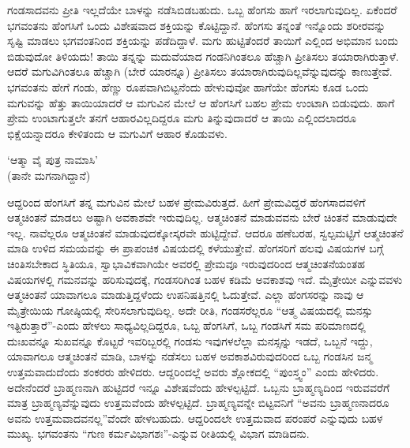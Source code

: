 ಗಂಡಸಾದವನು ಪ್ರೀತಿ ಇಲ್ಲದೆಯೇ ಬಾಳನ್ನು ನಡೆಸಿಬಿಡಬಹುದು. ಒಬ್ಬ ಹೆಂಗಸು ಹಾಗೆ ಇರಲಾಗುವುದಿಲ್ಲ. ಏಕೆಂದರೆ ಭಗವಂತನು ಹೆಂಗಸಿಗೆ ಒಂದು ವಿಶೇಷವಾದ ಶಕ್ತಿಯನ್ನು ಕೊಟ್ಟಿದ್ದಾನೆ. ಹೆಂಗಸು ತನ್ನಂತೆ ಇನ್ನೊಂದು ಶರೀರವನ್ನು ಸೃಷ್ಟಿ ಮಾಡಲು ಭಗವಂತನಿಂದ ಶಕ್ತಿಯನ್ನು ಪಡೆದಿದ್ದಾಳೆ. ಮಗು ಹುಟ್ಟಿತೆಂದರೆ ತಾಯಿಗೆ ಎಲ್ಲಿಂದ ಅಭಿಮಾನ ಬಂದು ಬಿಡುವುದೋ ತಿಳಿಯದು! ತಾಯಿ ತನ್ನನ್ನು ಮದುವೆಯಾದ ಗಂಡನಿಗಿಂತಲೂ ಹೆಚ್ಚಾಗಿ ಪ್ರೀತಿಸಲು ತಯಾರಾಗಿರುತ್ತಾಳೆ. ಆದರೆ ಮಗುವಿಗಿಂತಲೂ ಹೆಚ್ಚಾಗಿ (ಬೇರೆ ಯಾರನ್ನೂ) ಪ್ರೀತಿಸಲು ತಯಾರಾಗಿರುವುದಿಲ್ಲವೆನ್ನುವುದನ್ನು ಕಾಣುತ್ತೇವೆ. ಭಗವಂತನು ಹೇಗೆ ಗಂಡು, ಹೆಣ್ಣು ರೂಪವಾಗಿಬಿಟ್ಟನೆಂದು ಹೇಳುವುವೋ ಹಾಗೆಯೇ ಹೆಂಗಸು ಕೂಡ ಒಂದು ಮಗುವನ್ನು ಹೆತ್ತು ತಾಯಿಯಾದರೆ ಆ ಮಗುವಿನ ಮೇಲೆ ಆ ಹೆಂಗಸಿಗೆ ಬಹಲ ಪ್ರೇಮ ಉಂಟಾಗಿ ಬಿಡುವುದು. ಹಾಗೆ ಪ್ರೇಮ ಉಂಟಾಗುತ್ತಲೇ ತನಗೆ ಆಹಾರವಿಲ್ಲದಿದ್ದರೂ ಮಗು ತಿನ್ನುವುದಾದರೆ ಆ ತಾಯಿ ಎಲ್ಲಿಂದಲಾದರೂ ಭಿಕ್ಷೆಯನ್ನಾದರೂ ಕೇಳಿತಂದು ಆ ಮಗುವಿಗೆ ಆಹಾರ ಕೊಡುವಳು.

\begin{shloka}
`ಆತ್ಮಾ ವೈ ಪುತ್ರ ನಾಮಾಸಿ'\\
(ತಾನೇ ಮಗನಾಗಿದ್ದಾನೆ)
\end{shloka}

ಆದ್ದರಿಂದ ಹೆಂಗಸಿಗೆ ತನ್ನ ಮಗುವಿನ ಮೇಲೆ ಬಹಳ ಪ್ರೇಮವಿರುತ್ತದೆ. ಹೀಗೆ ಪ್ರೇಮವಿದ್ದರೆ ಹೆಂಗಸಾದವಳಿಗೆ ಆತ್ಮಚಿಂತನೆ ಮಾಡಲು ಅಷ್ಟಾಗಿ ಅವಕಾಶವೇ ಇರುವುದಿಲ್ಲ. ಆತ್ಮಚಿಂತನೆ ಮಾಡುವವನು ಬೇರೆ ಚಿಂತನೆ ಮಾಡುವುದೇ ಇಲ್ಲ. ನಾವೆಲ್ಲರೂ ಆತ್ಮಚಿಂತನೆ ಮಾಡುವುದಕ್ಕೋಸ್ಕರವೇ ಹುಟ್ಟಿದ್ದೇವೆ. ಆದರೂ ಹಣೆಬರಹ, ಸ್ವಲ್ಪಮಟ್ಟಿಗೆ ಆತ್ಮಚಿಂತನೆ ಮಾಡಿ ಉಳಿದ ಸಮಯವನ್ನು ಈ ಪ್ರಾಪಂಚಿಕ ವಿಷಯದಲ್ಲಿ ಕಳೆಯುತ್ತೇವೆ. ಹೆಂಗಸರಿಗೆ ಹಲವು ವಿಷಯಗಳ ಬಗ್ಗೆ ಚಿಂತಿಸಬೇಕಾದ ಸ್ಥಿತಿಯೂ, ಸ್ವಾಭಾವಿಕವಾಗಿಯೇ ಅವರಲ್ಲಿ ಪ್ರೇಮವೂ ಇರುವುದರಿಂದ ಆತ್ಮಚಿಂತನೆಯಂತಹ ವಿಷಯಗಳಲ್ಲಿ ಗಮನವನ್ನು ಹರಿಸುವುದಕ್ಕೆ, ಗಂಡಸರಿಗಿಂತ ಬಹಳ ಕಡಿಮೆ ಅವಕಾಶವು ಇದೆ. ಮೈತ್ರೇಯೀ ಎನ್ನುವವಳು ಆತ್ಮಚಿಂತನೆ ಯಾವಾಗಲೂ ಮಾಡುತ್ತಿದ್ದಳೆಂದು ಉಪನಿಷತ್ತಿನಲ್ಲಿ ಓದುತ್ತೇವೆ. ಎಲ್ಲಾ ಹೆಂಗಸರನ್ನು ನಾವು ಆ ಮೈತ್ರೇಯಿಯ ಗೋಷ್ಠಿಯಲ್ಲಿ ಸೇರಿಸಲಾಗುವುದಿಲ್ಲ. ಅದೇ ರೀತಿ, ಗಂಡಸರೆಲ್ಲರೂ ``ಆತ್ಮ ವಿಷಯದಲ್ಲಿ ಮನಸ್ಸು ಇತ್ಟಿರುತ್ತಾರೆ''-ಎಂದು ಹೇಳಲು ಸಾಧ್ಯವಿಲ್ಲದಿದ್ದರೂ, ಒಬ್ಬ ಹೆಂಗಸಿಗೆ, ಒಬ್ಬ ಗಂಡಸಿಗೆ ಸಮ ಪರಿಮಾಣದಲ್ಲಿ ದುಃಖವನ್ನೂ ಸುಖವನ್ನೂ ಕೊಟ್ಟರೆ ಇವರಿಬ್ಬರಲ್ಲಿ ಗಂಡಸು ಇವುಗಳಲೆಲ್ಲಾ ಮನಸ್ಸನ್ನು ಇಡದೆ, ಒಬ್ಬನೆ ಇದ್ದು, ಯಾವಾಗಲೂ ಆತ್ಮಚಿಂತನೆ ಮಾಡಿ, ಬಾಳನ್ನು ನಡೆಸಲು ಬಹಳ ಅವಕಾಶವಿರುವುದರಿಂದ ಒಬ್ಬ ಗಂಡಸಿನ ಜನ್ಮ ಉತ್ತಮವಾದುದೆಂದು ಶಂಕರರು ಹೇಳಿದರು. ಆದ್ದರಿಂದಲ್ಲೆ ಅವರು ಶ್ಲೋಕದಲ್ಲಿ ``ಪುಂಸ್ತ್ವಂ'' ಎಂದು ಹೇಳಿದರು. ಅದೇನೆಂದರೆ ಬ್ರಾಹ್ಮಣನಾಗಿ ಹುಟ್ಟಿದರೆ ಇನ್ನೂ ವಿಶೇಷವೆಂದು ಹೇಳಲ್ಪಟ್ಟಿದೆ. ಒಬ್ಬನು ಬ್ರಾಹ್ಮಣ್ಯದಿಂದ ಇರುವವರೆಗೆ ಮಾತ್ರ ಬ್ರಾಹ್ಮಣ್ಯವೆನ್ನುವುದು ಉತ್ತಮವೆಂದು ಹೇಳಲ್ಪಟ್ಟಿದೆ. ಬ್ರಾಹ್ಮಣ್ಯವನ್ನೇ ಬಿಟ್ಟವನಿಗೆ ``ಅವನು ಬ್ರಾಹ್ಮಣನಾದರೂ ಅವನು ಉತ್ತಮವಾದವನಲ್ಲ''ವೆಂದೇ ಹೇಳಬಹುದು. ಆದ್ದರಿಂದಲೇ ಉತ್ತಮವಾದ ಪರಂಪರೆ ಎನ್ನುವುದು ಬಹಳ ಮುಖ್ಯ. ಭಗವಂತನು ``ಗುಣ ಕರ್ಮವಿಭಾಗಶಃ''-ಎನ್ನುವ ರೀತಿಯಲ್ಲಿ ವಿಭಾಗ ಮಾಡಿದನು.

